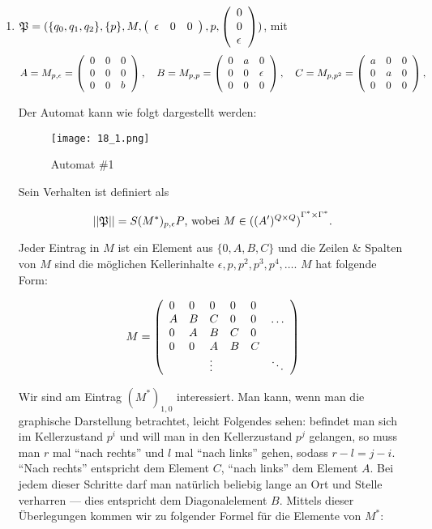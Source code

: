 \documentclass[]{scrartcl}
\newcommand{\matr}[2]{\left(\begin{array}{#1}#2\end{array}\right)}
\newcommand{\mt}[1]{\textnormal{#1}}
\begin{document}
\begin{enumerate}
	\item $
		\mathfrak{P} = (\{q_0,q_1,q_2\}, \{p\}, M, \matr{l l l}{\epsilon & 0 & 0}, p, \matr{l}{0\\0\\ \epsilon})
	$, mit \\
	
	$$
		A = M_{p,\epsilon} = \matr{l l l}{0 & 0 & 0\\
										  0 & 0 & 0\\
										  0 & 0 & b}, 
\quad
		B = M_{p,p} = \matr{l l l}{0 & a & 0\\
								   0 & 0 & \epsilon\\
								   0 & 0 & 0}, 
\quad
		C = M_{p,p^2} = \matr{l l l}{a & 0 & 0\\
								    0 & a & 0\\
								    0 & 0 & 0}, 
	$$
	
	Der Automat kann wie folgt dargestellt werden:
	
	\begin{figure}[h]
		\centering
		\texttt{[image: 18\_1.png]}
		\caption{Automat \#1}
	\end{figure}
	 
	
	
	Sein Verhalten ist definiert als
	
	$$
		||\mathfrak{P}|| = S (M^*)_{p,\epsilon} P\mt{, wobei } M \in {((A')^{Q \times Q})}^{\Gamma^* \times \Gamma^*}.
	$$
	
	Jeder Eintrag in $M$ ist ein Element aus $\{0, A, B, C\}$ und die Zeilen \& Spalten von $M$ sind die möglichen Kellerinhalte $\epsilon, p, p^2, p^3, p^4, \dots$. $M$ hat folgende Form:
	
	$$
		M = \matr{l l l l l l}{0 & 0 & 0 & 0 & 0 & \\
							   A & B & C & 0 & 0 & \dots\\
							   0 & A & B & C & 0 & \\
							   0 & 0 & A & B & C & \\
							     &   & \vdots & & & \ddots}
	$$
	
	Wir sind am Eintrag $(M^*)_{1,0}$ interessiert. Man kann, wenn man die graphische Darstellung betrachtet, leicht Folgendes sehen: befindet man sich im Kellerzustand $p^i$ und will man in den Kellerzustand $p^j$ gelangen, so muss man $r$ mal ``nach rechts'' und $l$ mal ``nach links'' gehen, sodass $r-l = j - i$. ``Nach rechts'' entspricht dem Element $C$, ``nach links'' dem Element $A$. Bei jedem dieser Schritte darf man natürlich beliebig lange an Ort und Stelle verharren --- dies entspricht dem Diagonalelement $B$. Mittels dieser Überlegungen kommen wir zu folgender Formel für die Elemente von $M^*$:
	

\end{enumerate}
\end{document}
